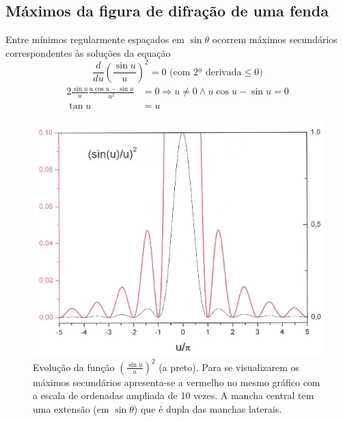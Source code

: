\documentclass[a4paper,12pt]{article}
\begin{document}
\subsection{Máximos da figura de difração de uma fenda} \label{sec:maxfenda}
Entre mínimos regularmente espaçados em $\sin \theta $ ocorrem máximos secundários correspondentes às soluções da equação 
\begin{equation}
	\label{eq:35} \frac{d}{d u} \left( \frac{\sin u}{u} \right)^2 = 0 \text{ (com 2ª derivada} \le 0) 
\end{equation}
\begin{align}
	\label{eq:36} 2 \frac{\sin u}{u} \frac{u \cos u- \sin u}{u^2} &= 0 \Rightarrow u \ne 0 \land u \cos u- \sin u =0\nonumber \\
	\tan u &= u 
\end{align}


\begin{figure}[thbp]  \centering 
	\includegraphics[width=0.8
	\textwidth]{figura4.png} \caption{
	Evolução da função $\left( \frac{\sin u}{u} \right)^2 $ (a preto). Para se visualizarem os máximos secundários apresenta-se a vermelho no mesmo gráfico com a escala de ordenadas ampliada de 10 vezes.
A mancha central tem uma extensão (em $\sin \theta$) que é dupla das manchas laterais. \label{fig:4}} 
\end{figure}
\end{document}
